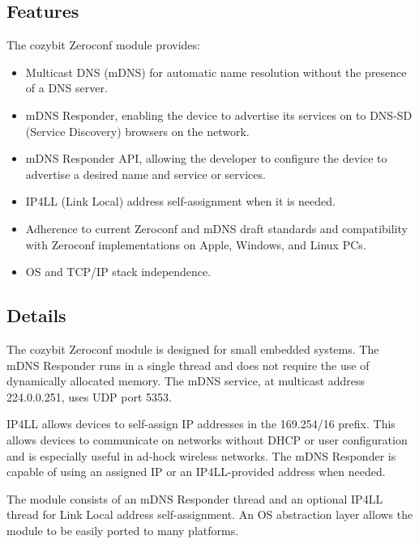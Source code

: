 \documentclass[11pt,titlepage]{article}
\begin{document}
\subsection{Features}

The cozybit Zeroconf module provides:

\begin{itemize}
	\item Multicast DNS (mDNS) for automatic name resolution without the
		  presence of a DNS server.
	\item mDNS Responder, enabling the device to advertise its services on
		  to DNS-SD (Service Discovery) browsers on the network.
	\item mDNS Responder API, allowing the developer to configure the device
		  to advertise a desired name and service or services.
	\item IP4LL (Link Local) address self-assignment when it is needed.
	\item Adherence to current Zeroconf and mDNS draft standards and 
		  compatibility with Zeroconf implementations on Apple, Windows, and
		  Linux PCs.
	\item OS and TCP/IP stack independence.
\end{itemize}

\subsection{Details}

The cozybit Zeroconf module is designed for small embedded systems.  The mDNS 
Responder runs in a single thread and does not require the use of dynamically 
allocated memory.  The mDNS service, at multicast address 224.0.0.251, uses 
UDP port 5353.

IP4LL allows devices to self-assign IP addresses in the 169.254/16 prefix. 
This allows devices to communicate on networks without DHCP or user 
configuration and is especially useful in ad-hock wireless networks.  The mDNS
Responder is capable of using an assigned IP or an IP4LL-provided address when
needed.

The module consists of an mDNS Responder thread and an optional IP4LL thread 
for Link Local address self-assignment.  An OS abstraction layer allows the 
module to be easily ported to many platforms.

\begin{center}
\end{center}
\end{document}
